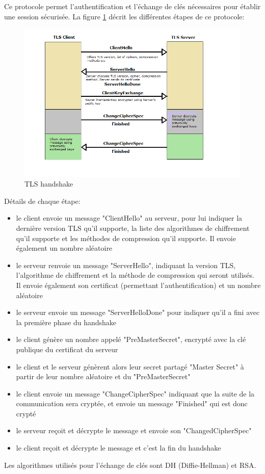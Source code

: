 Ce protocole permet l'authentification et l'échange de clés nécessaires pour établir une session sécurisée. La figure \ref{handshake} décrit les différentes étapes de ce protocole:
\begin{figure}[H]
  \centering
  \includegraphics[scale=0.6]{img/tls-handshake.png}
  \caption{TLS handshake}
  \label{handshake}
\end{figure}  

Détails de chaque étape:
\begin{itemize}
\item le client envoie un message "ClientHello" au serveur, pour lui indiquer la dernière version TLS qu'il supporte, la liste des algorithmes de chiffrement qu'il supporte et les méthodes de compression qu'il supporte. Il envoie également un nombre aléatoire
\item le serveur renvoie un message "ServerHello", indiquant la version TLS, l'algorithme de chiffrement et la méthode de compression qui seront utilisés. Il envoie également son certificat (permettant l'authentification) et un nombre aléatoire
\item le serveur envoie un message "ServerHelloDone" pour indiquer qu'il a fini avec la première phase du handshake
\item le client génère un nombre appelé "PreMasterSecret", encrypté avec la clé publique du certificat du serveur
\item le client et le serveur génèrent alors leur secret partagé "Master Secret" à partir de leur nombre aléatoire et du "PreMasterSecret"
\item le client envoie un message "ChangeCipherSpec" indiquant que la suite de la communication sera cryptée, et envoie un message "Finished" qui est donc crypté
\item le serveur reçoit et décrypte le message et envoie son "ChangedCipherSpec"
\item le client reçoit et décrypte le message et c'est la fin du handshake
\end{itemize}
Les algorithmes utilisés pour l'échange de clés sont DH (Diffie-Hellman) et RSA. 

